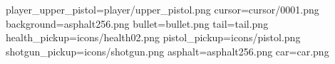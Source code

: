 player_upper_pistol=player/upper_pistol.png
cursor=cursor/0001.png
background=asphalt256.png
bullet=bullet.png
tail=tail.png
health_pickup=icons/health02.png
pistol_pickup=icons/pistol.png
shotgun_pickup=icons/shotgun.png
asphalt=asphalt256.png
car=car.png
